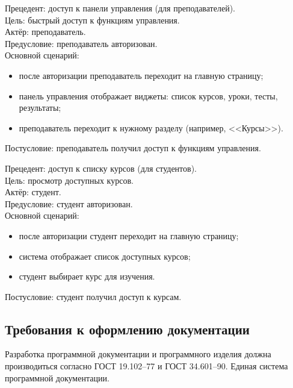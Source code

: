 	{Прецедент: доступ к панели управления (для преподавателей)}. \\
	{Цель}: быстрый доступ к функциям управления. \\
	{Актёр}: преподаватель. \\
	{Предусловие}: преподаватель авторизован. \\
	{Основной сценарий}:
	\begin{itemize}
		\item после авторизации преподаватель переходит на главную страницу;
		\item панель управления отображает виджеты: список курсов, уроки, тесты, результаты;
		\item преподаватель переходит к нужному разделу (например, <<Курсы>>).
	\end{itemize}
	{Постусловие}: преподаватель получил доступ к функциям управления.
	
	{Прецедент: доступ к списку курсов (для студентов)}. \\
	{Цель}: просмотр доступных курсов. \\
	{Актёр}: студент. \\
	{Предусловие}: студент авторизован. \\
	{Основной сценарий}:
	\begin{itemize}
		\item после авторизации студент переходит на главную страницу;
		\item система отображает список доступных курсов;
		\item студент выбирает курс для изучения.
	\end{itemize}
	{Постусловие}: студент получил доступ к курсам.


\subsection{Требования к оформлению документации}

Разработка программной документации и программного изделия должна производиться согласно ГОСТ 19.102–77 и ГОСТ 34.601–90. Единая система программной документации.
